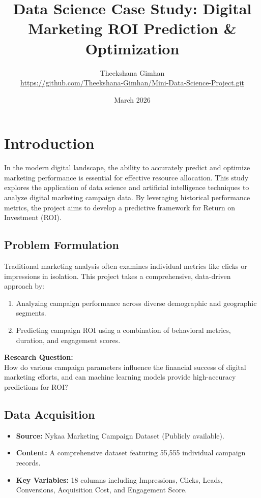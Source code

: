 \documentclass[12pt]{article}
\title{Data Science Case Study: Digital Marketing ROI Prediction \& Optimization}
\author{Theekshana Gimhan \\ \small \url{https://github.com/Theekshana-Gimhan/Mini-Data-Science-Project.git}}
\date{March 2026}
\begin{document}
\maketitle

\section{Introduction}
In the modern digital landscape, the ability to accurately predict and optimize marketing performance is essential for effective resource allocation. This study explores the application of data science and artificial intelligence techniques to analyze digital marketing campaign data. By leveraging historical performance metrics, the project aims to develop a predictive framework for Return on Investment (ROI).

\subsection{Problem Formulation}
Traditional marketing analysis often examines individual metrics like clicks or impressions in isolation. This project takes a comprehensive, data-driven approach by:
\begin{enumerate}
    \item Analyzing campaign performance across diverse demographic and geographic segments.
    \item Predicting campaign ROI using a combination of behavioral metrics, duration, and engagement scores.
\end{enumerate}

\textbf{Research Question:} \\
How do various campaign parameters influence the financial success of digital marketing efforts, and can machine learning models provide high-accuracy predictions for ROI?

\subsection{Data Acquisition}
\begin{itemize}
    \item \textbf{Source:} Nykaa Marketing Campaign Dataset (Publicly available).
    \item \textbf{Content:} A comprehensive dataset featuring 55,555 individual campaign records.
    \item \textbf{Key Variables:} 18 columns including Impressions, Clicks, Leads, Conversions, Acquisition Cost, and Engagement Score.
\end{itemize}
\end{document}
